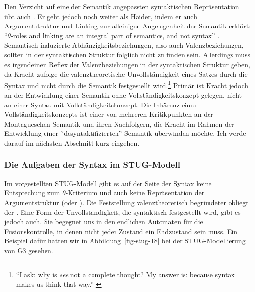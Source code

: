 {Den Verzicht auf eine der Semantik angepassten syntaktischen Repräsentation übt auch \cite{Kracht:07,Kracht:11}. Er geht jedoch noch weiter als Haider, indem er auch Argumentstruktur und Linking zur alleinigen Angelegenheit der Semantik erklärt: "`$\theta$-roles and linking are an integral part of semantics, and not syntax"' \cite[48]{Kracht:07}. Semantisch induzierte Abhängigkeitsbeziehungen, also auch Valenzbeziehungen, sollten in der syntaktischen Struktur folglich nicht zu finden sein. Allerdings muss es irgendeinen Reflex der Valenzbeziehungen in der syntaktischen Struktur geben, da Kracht zufolge die valenztheoretische Unvollständigkeit eines Satzes durch die Syntax und nicht durch die Semantik festgestellt wird.\footnote{"`I ask: why is {\it see} not a complete thought? My answer is: because syntax makes us think that way."' \cite[55]{Kracht:07}} Primär ist Kracht jedoch an der Entwicklung einer Semantik ohne Vollständigkeitskonzept gelegen, nicht an einer Syntax mit Vollständigkeitskonzept. Die Inhärenz eines Vollständigkeitskonzepts ist einer von mehreren Kritikpunkten an der Montagueschen Semantik und ihren Nachfolgern, die Kracht im Rahmen der Entwicklung einer "`desyntaktifizierten"' Semantik überwinden möchte. Ich werde darauf im nächsten Abschnitt kurz eingehen.%


\subsubsection*{Die Aufgaben der Syntax im STUG-Modell}

Im vorgestellten STUG-Modell gibt es auf der Seite der Syntax keine Entsprechung zum $\theta$-Kriterium und auch keine Repräsentation der Argumentstruktur (oder ). Die Feststellung valenztheoretisch begründeter  obliegt der . Eine Form der Unvollständigkeit, die syntaktisch festgestellt wird, gibt es jedoch auch. Sie begegnet uns in den endlichen Automaten für die Fusionskontrolle, in denen nicht jeder Zustand ein Endzustand sein muss. Ein Beispiel dafür hatten wir in Abbildung~\ref{fig-stug-18} bei der STUG-Modellierung von G3 gesehen.

}
